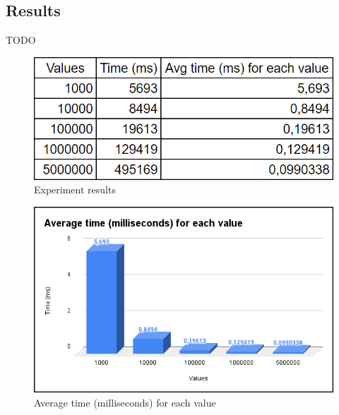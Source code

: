 \subsection{Results}
TODO

\begin{figure}[!ht]
    \centering
    \includegraphics[scale=0.55]{document/chapters/chapter_7/images/experiment_results.png}
    \caption{Experiment results}
    \label{fig:experiment_results}
\end{figure}

\begin{figure}[!ht]
    \centering
    \includegraphics[scale=0.55]{document/chapters/chapter_7/images/experiment_results_avg_ms_per_value.png}
    \caption{Average time (milliseconds) for each value}
    \label{fig:experiment_results_avg_ms_per_value}
\end{figure}